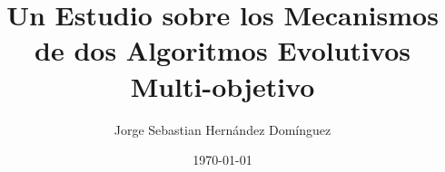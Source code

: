 \documentclass[english,ENG,MSc]{cinvestav} %
\title     {Un Estudio sobre los Mecanismos de dos Algoritmos Evolutivos Multi-objetivo}
\author         {Jorge Sebastian Hern\'{a}ndez Dom\'{i}nguez}
\date           {\today}
\begin{document}
\makeintropages


\begin{doublespace}


%

%

%

%

%

%

\end{doublespace}

\appendix

\begin{doublespace}

%

%

%

\end{doublespace}
\end{document}
